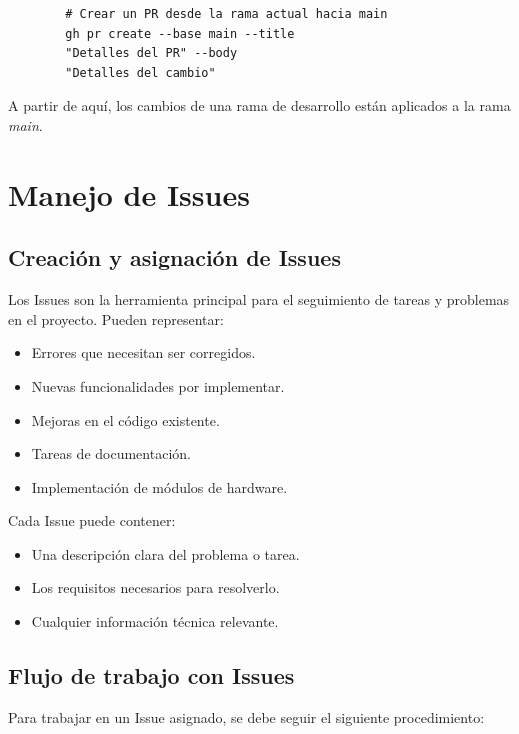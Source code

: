 \documentclass[a4paper]{article}
\begin{document}
    \begin{lstlisting}
        # Crear un PR desde la rama actual hacia main
        gh pr create --base main --title
        "Detalles del PR" --body
        "Detalles del cambio"
    \end{lstlisting}

\indent A partir de aquí, los cambios de una rama de desarrollo están aplicados a la rama \textit{main}.


\section{Manejo de Issues}

\subsection{Creación y asignación de Issues}

\indent Los Issues son la herramienta principal para el seguimiento de tareas y problemas en el proyecto. Pueden representar: \\

\begin{itemize}
    \item Errores que necesitan ser corregidos.
    \item Nuevas funcionalidades por implementar.
    \item Mejoras en el código existente.
    \item Tareas de documentación.
    \item Implementación de módulos de hardware.
\end{itemize}

\indent Cada Issue puede contener: \\

\begin{itemize}
    \item Una descripción clara del problema o tarea.
    \item Los requisitos necesarios para resolverlo.
    \item Cualquier información técnica relevante.
\end{itemize}

\subsection{Flujo de trabajo con Issues}

\indent Para trabajar en un Issue asignado, se debe seguir el siguiente procedimiento: \\
\end{document}
